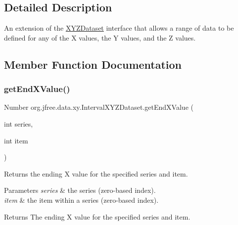 \subsection{Detailed Description}
An extension of the \mbox{\hyperlink{interfaceorg_1_1jfree_1_1data_1_1xy_1_1_x_y_z_dataset}{X\+Y\+Z\+Dataset}} interface that allows a range of data to be defined for any of the X values, the Y values, and the Z values. 

\subsection{Member Function Documentation}
\mbox{\label{interfaceorg_1_1jfree_1_1data_1_1xy_1_1_interval_x_y_z_dataset_a2751b04f228ec1092fd984ad6aeae847}} 
\subsubsection{\texorpdfstring{get\+End\+X\+Value()}{getEndXValue()}}
{\footnotesize\ttfamily Number org.\+jfree.\+data.\+xy.\+Interval\+X\+Y\+Z\+Dataset.\+get\+End\+X\+Value (\begin{DoxyParamCaption}\item[{int}]{series,  }\item[{int}]{item }\end{DoxyParamCaption})}

Returns the ending X value for the specified series and item.


\begin{DoxyParams}{Parameters}
{\em series} & the series (zero-\/based index). \\
\hline
{\em item} & the item within a series (zero-\/based index).\\
\hline
\end{DoxyParams}
\begin{DoxyReturn}{Returns}
The ending X value for the specified series and item. 
\end{DoxyReturn}
\mbox{\label{interfaceorg_1_1jfree_1_1data_1_1xy_1_1_interval_x_y_z_dataset_a384139522f1ca2ee7a65173b2474db99}} 
